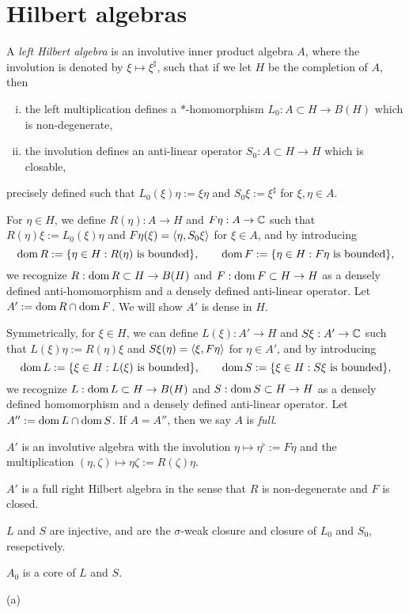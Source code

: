 \documentclass{../../large}
\begin{document}
\section{Hilbert algebras}

\begin{prb}
A \emph{left Hilbert algebra} is an involutive inner product algebra $A$, where the involution is denoted by $\xi\mapsto\xi^\sharp$, such that if we let $H$ be the completion of $A$, then
\begin{enumerate}[(i)]
\item the left multiplication defines a $*$-homomorphism $L_0:A\subset H\to B(H)$ which is non-degenerate,
\item the involution defines an anti-linear operator $S_0:A\subset H\to H$ which is closable,
\end{enumerate}
precisely defined such that $L_0(\xi)\eta:=\xi\eta$ and $S_0\xi:=\xi^\sharp$ for $\xi,\eta\in A$.

For $\eta\in H$, we define $R(\eta):A\to H$ and $F\eta:A\to\mathbb{C}$ such that $R(\eta)\xi:=L_0(\xi)\eta$ and $F\eta(\xi)=\langle\eta,S_0\xi\rangle$ for $\xi\in A$, and by introducing
\[\operatorname{dom} R:=\{\eta\in H:R(\eta)\text{ is bounded}\},\qquad\operatorname{dom} F:=\{\eta\in H:F\eta\text{ is bounded}\},\]
we recognize $R:\operatorname{dom} R\subset H\to B(H)$ and $F:\operatorname{dom} F\subset H\to H$ as a densely defined anti-homomorphism and a densely defined anti-linear operator.
Let $A':=\operatorname{dom} R\cap\operatorname{dom} F$.
We will show $A'$ is dense in $H$.

Symmetrically, for $\xi\in H$, we can define $L(\xi):A'\to H$ and $S\xi:A'\to\mathbb{C}$ such that $L(\xi)\eta:=R(\eta)\xi$ and $S\xi(\eta)=\langle\xi,F\eta\rangle$ for $\eta\in A'$, and by introducing
\[\operatorname{dom} L:=\{\xi\in H:L(\xi)\text{ is bounded}\},\qquad\operatorname{dom} S:=\{\xi\in H:S\xi\text{ is bounded}\},\]
we recognize $L:\operatorname{dom} L\subset H\to B(H)$ and $S:\operatorname{dom} S\subset H\to H$ as a densely defined homomorphism and a densely defined anti-linear operator.
Let $A'':=\operatorname{dom} L\cap\operatorname{dom} S$.
If $A=A''$, then we say $A$ is \emph{full}.
\begin{parts}
\item $A'$ is an involutive algebra with the involution $\eta\mapsto\eta^\flat:=F\eta$ and the multiplication $(\eta,\zeta)\mapsto\eta\zeta:=R(\zeta)\eta$.
\item $A'$ is a full right Hilbert algebra in the sense that $R$ is non-degenerate and $F$ is closed.
\item $L$ and $S$ are injective, and are the $\sigma$-weak closure and closure of $L_0$ and $S_0$, resepctively.
\item $A_0$ is a core of $L$ and $S$.
\end{parts}
\end{prb}
\begin{pf}
(a)


\end{pf}
\end{document}
